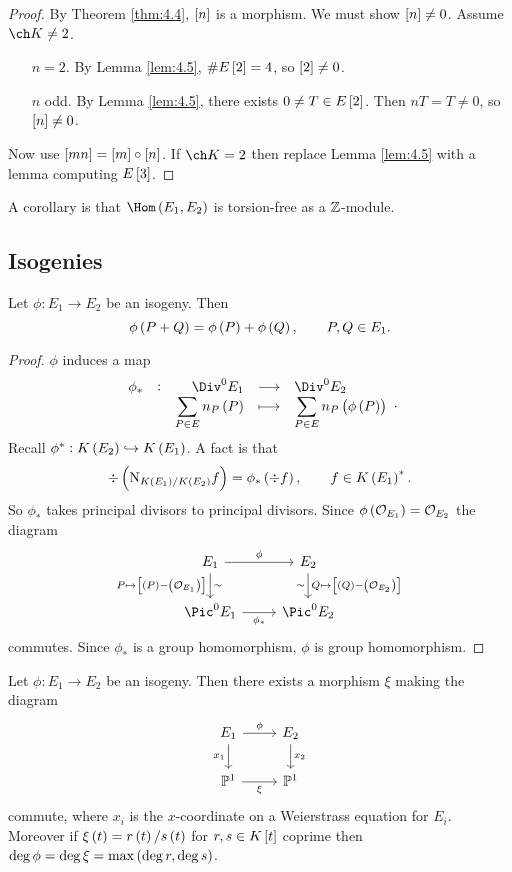 \begin{proof}
By Theorem \ref{thm:4.4}, $ \sbr{n} $ is a morphism. We must show $ \sbr{n} \ne 0 $. Assume $ \ch K \ne 2 $.
\begin{itemize}[leftmargin=0.5in]
\item[$ n = 2 $.] By Lemma \ref{lem:4.5}, $ \#E\sbr{2} = 4 $, so $ \sbr{2} \ne 0 $.
\item[$ n $ odd.] By Lemma \ref{lem:4.5}, there exists $ 0 \ne T \in E\sbr{2} $. Then $ nT = T \ne 0 $, so $ \sbr{n} \ne 0 $.
\end{itemize}
Now use $ \sbr{mn} = \sbr{m} \circ \sbr{n} $. If $ \ch K = 2 $ then replace Lemma \ref{lem:4.5} with a lemma computing $ E\sbr{3} $.
\end{proof}

A corollary is that $ \Hom\br{E_1, E_2} $ is torsion-free as a $ \mathbb{Z} $-module.

\subsection{Isogenies}

\begin{lemma}
Let $ \phi : E_1 \to E_2 $ be an isogeny. Then
$$ \phi\br{P + Q} = \phi\br{P} + \phi\br{Q}, \qquad P, Q \in E_1. $$
\end{lemma}

\begin{proof}
$ \phi $ induces a map
$$ \function[\phi_*]{\Div^0 E_1}{\Div^0 E_2}{\displaystyle\sum_{P \in E} n_P\br{P}}{\displaystyle\sum_{P \in E} n_P\br{\phi\br{P}}}. $$
Recall $ \phi^* : K\br{E_2} \hookrightarrow K\br{E_1} $. A fact is that
$$ \div \br{\N_{K\br{E_1} / K\br{E_2}} f} = \phi_*\br{\div f}, \qquad f \in K\br{E_1}^*. $$
So $ \phi_* $ takes principal divisors to principal divisors. Since $ \phi\br{\OOO_{E_1}} = \OOO_{E_2} $ the diagram
$$
\begin{tikzcd}
E_1 \arrow{r}{\phi} \arrow{d}{\sim}[swap]{P \mapsto \sbr{\br{P} - \br{\OOO_{E_1}}}} & E_2 \arrow{d}{Q \mapsto \sbr{\br{Q} - \br{\OOO_{E_2}}}}[swap]{\sim} \\
\Pic^0 E_1 \arrow{r}[swap]{\phi_*} & \Pic^0 E_2
\end{tikzcd}
$$
commutes. Since $ \phi_* $ is a group homomorphism, $ \phi $ is group homomorphism.
\end{proof}

\begin{lemma}
\label{lem:5.3}
Let $ \phi : E_1 \to E_2 $ be an isogeny. Then there exists a morphism $ \xi $ making the diagram
$$
\begin{tikzcd}
E_1 \arrow{r}{\phi} \arrow{d}[swap]{x_1} & E_2 \arrow{d}{x_2} \\
\PP^1 \arrow{r}[swap]{\xi} & \PP^1
\end{tikzcd}
$$
commute, where $ x_i $ is the $ x $-coordinate on a Weierstrass equation for $ E_i $. Moreover if $ \xi\br{t} = r\br{t} / s\br{t} $ for $ r, s \in K\sbr{t} $ coprime then $ \deg \phi = \deg \xi = \max\br{\deg r, \deg s} $.
\end{lemma}


